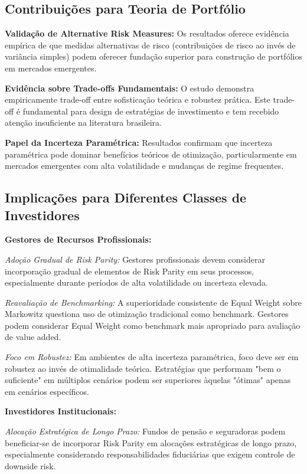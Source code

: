 \subsection{Contribuições para Teoria de Portfólio}

\textbf{Validação de Alternative Risk Measures:} Os resultados oferece evidência empírica de que medidas alternativas de risco (contribuições de risco ao invés de variância simples) podem oferecer fundação superior para construção de portfólios em mercados emergentes.

\textbf{Evidência sobre Trade-offs Fundamentais:} O estudo demonstra empiricamente trade-off entre sofisticação teórica e robustez prática. Este trade-off é fundamental para design de estratégias de investimento e tem recebido atenção insuficiente na literatura brasileira.

\textbf{Papel da Incerteza Paramétrica:} Resultados confirmam que incerteza paramétrica pode dominar benefícios teóricos de otimização, particularmente em mercados emergentes com alta volatilidade e mudanças de regime frequentes.

\subsection{Implicações para Diferentes Classes de Investidores}

\textbf{Gestores de Recursos Profissionais:}

\textit{Adoção Gradual de Risk Parity:} Gestores profissionais devem considerar incorporação gradual de elementos de Risk Parity em seus processos, especialmente durante períodos de alta volatilidade ou incerteza elevada.

\textit{Reavaliação de Benchmarking:} A superioridade consistente de Equal Weight sobre Markowitz questiona uso de otimização tradicional como benchmark. Gestores podem considerar Equal Weight como benchmark mais apropriado para avaliação de value added.

\textit{Foco em Robustez:} Em ambientes de alta incerteza paramétrica, foco deve ser em robustez ao invés de otimalidade teórica. Estratégias que performam "bem o suficiente" em múltiplos cenários podem ser superiores àquelas "ótimas" apenas em cenários específicos.

\textbf{Investidores Institucionais:}

\textit{Alocação Estratégica de Longo Prazo:} Fundos de pensão e seguradoras podem beneficiar-se de incorporar Risk Parity em alocações estratégicas de longo prazo, especialmente considerando responsabilidades fiduciárias que exigem controle de downside risk.

